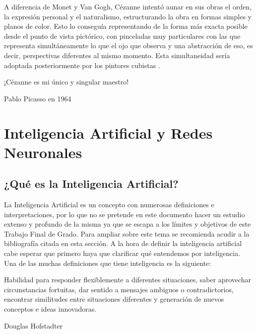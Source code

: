 \documentclass[../main.tex]{subfiles}
\begin{document}
A diferencia de Monet y Van Gogh, Cézanne intentó aunar en sus obras el orden, la expresión personal y el naturalismo, estructurando la obra en formas simples y planos de color. Esto lo conseguía representando de la forma más exacta posible desde el punto de vista pictórico, con pinceladas muy particulares con las que representa simultáneamente lo que el ojo que observa y una abstracción de eso, es decir, perspectivas diferentes al mismo momento. Esta simultaneidad sería adoptada posteriormente por los pintores cubistas \cite{CalvoSantos2016-3}.

 \begin{center}
    \begin{minipage}{0.9\linewidth}
        \vspace{5pt}%
        {\small
            ¡Cézanne es mi único y singular maestro!
        }
        \begin{flushright} Pablo Picasso en 1964 \cite{WikiquoteCezanne}
        \end{flushright}
        \vspace{1pt}%
    \end{minipage}
\end{center}

\section{Inteligencia Artificial y Redes Neuronales}
\subsection{¿Qué es la Inteligencia Artificial?}
La Inteligencia Artificial es un concepto con numerosas definiciones e interpretaciones, por lo que no se pretende en este documento hacer un estudio extenso y profundo de la misma ya que se escapa a los límites y objetivos de este Trabajo Final de Grado. Para ampliar sobre este tema se recomienda acudir a la bibliografía citada en esta sección. \newline
A la hora de definir la inteligencia artificial cabe esperar que primero haya que clarificar qué entendemos por inteligencia. Una de las muchas definiciones que tiene inteligencia es la siguiente:

 \begin{center}
    \begin{minipage}{0.9\linewidth}
        \vspace{5pt}%
        {\small
            Habilidad para responder flexiblemente a diferentes situaciones, saber aprovechar circunstancias fortuitas, dar sentido a mensajes ambiguos o contradictorios, encontrar similitudes entre situaciones diferentes y generación de nuevos conceptos e ideas innovadoras.
        }
        \begin{flushright} Douglas Hofstadter \cite{Garcia2012}
        \end{flushright}
        \vspace{3pt}%
    \end{minipage}
\end{center}
\end{document}
